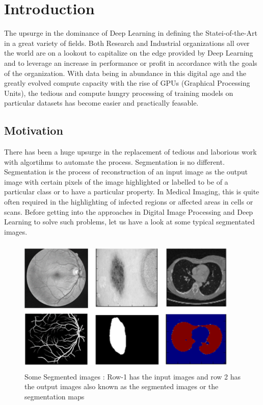 \documentclass[19pt]{article}
\begin{document}
\section{Introduction}
The upsurge in the dominance of Deep Learning in defining the Statei-of-the-Art in a great variety of fields. Both Research and Industrial organizations all over the world are on a lookout to capitalize on the edge provided by Deep Learning and to leverage an increase in performance or profit in accordance with the goals of the organization. With data being in abundance in this digital age and the greatly evolved compute capacity with the rise of GPUs (Graphical Processing Units), the tedious and compute hungry processing of training models on particular datasets has become easier and practically feasable.

\subsection{Motivation}
There has been a huge upsurge in the replacement of tedious and laborious work with algortihms to automate the process. Segmentation is no different. Segmentation is the process of reconstruction of an input image as the output image with certain pixels of the image highlighted or labelled to be of a particular class or to have a particular property. In Medical Imaging, this is quite often required in the highlighting of infected regions or affected areas in cells or scans. Before getting into the approaches in Digital Image Processing and Deep Learning to solve such problems, let us have a look at some typical segmentated images.

\begin{center}
    \begin{figure}[!h!t!b]
        \centerline{\includegraphics[width=105mm,height=65mm]{images/segs.png}}
        \caption{Some Segmented images : Row-1 has the input images and row 2 has the output images also known as the segmented images or the segmentation maps}
        \label{fig:1}
    \end{figure}
\end{center}
\end{document}
